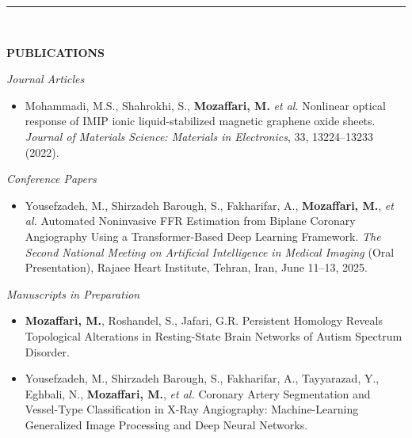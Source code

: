 \documentclass[12pt, b4paper]{cv}
\begin{document}

	


\vspace{-0.15in}
\rule{\textwidth}{1pt}\\
\vspace{-0.15in}

{\Large \textbf{PUBLICATIONS}}
\vspace{5pt}

\textit{Journal Articles}
\begin{itemize}
    \item Mohammadi, M.S., Shahrokhi, S., \textbf{Mozaffari, M.} \textit{et al.}
    Nonlinear optical response of IMIP ionic liquid-stabilized magnetic graphene oxide sheets.
    \textit{Journal of Materials Science: Materials in Electronics}, 33, 13224–13233 (2022).
\end{itemize}

\textit{Conference Papers}
\begin{itemize}
    \item Yousefzadeh, M., Shirzadeh Barough, S., Fakharifar, A., \textbf{Mozaffari, M.}, \textit{et al.}
    Automated Noninvasive FFR Estimation from Biplane Coronary Angiography Using a Transformer-Based Deep Learning Framework.
    \textit{The Second National Meeting on Artificial Intelligence in Medical Imaging} (Oral Presentation), Rajaee Heart Institute, Tehran, Iran, June 11–13, 2025.
\end{itemize}

\textit{Manuscripts in Preparation}
\begin{itemize}
    \item \textbf{Mozaffari, M.}, Roshandel, S., Jafari, G.R.
    Persistent Homology Reveals Topological Alterations in Resting-State Brain Networks of Autism Spectrum Disorder.

    \item Yousefzadeh, M., Shirzadeh Barough, S., Fakharifar, A., Tayyarazad, Y., Eghbali, N., \textbf{Mozaffari, M.}, \textit{et al.}
    Coronary Artery Segmentation and Vessel-Type Classification in X-Ray Angiography: Machine-Learning Generalized Image Processing and Deep Neural Networks.

\end{itemize}
\end{document}
